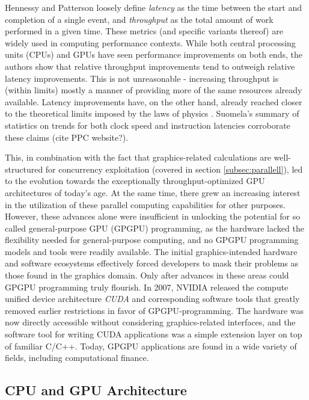 \documentclass[english,12pt,a4paper,pdftex,sci,utf8]{aaltothesis}
\begin{document}
Hennessy and Patterson \cite{hennessy2011computer} loosely define \emph{latency} as the time between the start and completion of a single event, and \emph{throughput} as the total amount of work performed in a given time. These metrics (and specific variants thereof) are widely used in computing performance contexts. While both central processing units (CPUs) and GPUs have seen performance improvements on both ends, the authors show that relative throughput improvements tend to outweigh relative latency improvements. This is not unreasonable - increasing throughput is (within limits) mostly a manner of providing more of the same resources already available. Latency improvements have, on the other hand, already reached closer to the theoretical limits imposed by the laws of physics \cite{hennessy2011computer} \cite{sanders2010cuda}. Suomela's summary of statistics on trends for both clock speed and instruction latencies corroborate these claims (cite PPC website?).

This, in combination with the fact that graphics-related calculations are well-structured for concurrency exploitation (covered in section \ref{subsec:parallell}), led to the evolution towards the exceptionally throughput-optimized GPU architectures of today's age. At the same time, there grew an increasing interest in the utilization of these parallel computing capabilities for other purposes. However, these advances alone were insufficient in unlocking the potential for so called general-purpose GPU (GPGPU) programming, as the hardware lacked the flexibility needed for general-purpose computing, and no GPGPU programming models and tools were readily available. The initial graphics-intended hardware and software ecosystems effectively forced developers to mask their problems as those found in the graphics domain. Only after advances in these areas could GPGPU programming truly flourish. In 2007, NVIDIA released the compute unified device architecture \emph{CUDA} and corresponding software tools that greatly removed earlier restrictions in favor of GPGPU-programming. The hardware was now directly accessible without considering graphics-related interfaces, and the software tool for writing CUDA applications was a simple extension layer on top of familiar C/C++. Today, GPGPU applications are found in a wide variety of fields, including computational finance. \cite{sanders2010cuda} \cite{kirk2016programming}

\subsection{CPU and GPU Architecture}
\end{document}

